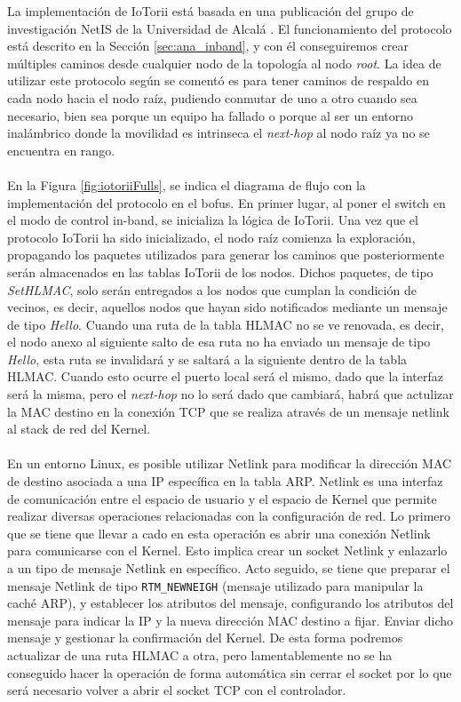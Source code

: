 La implementación de IoTorii está basada en una publicación del grupo de investigación NetIS de la Universidad de Alcalá \cite{rojas2021outperforming}. El funcionamiento del protocolo está descrito en la Sección \ref{sec:ana_inband}, y con él conseguiremos crear múltiples caminos desde cualquier nodo de la topología al nodo \textit{root}. La idea de utilizar este protocolo según se comentó es para tener caminos de respaldo en cada nodo hacia el nodo raíz, pudiendo conmutar de uno a otro cuando sea necesario, bien sea porque un equipo ha fallado o porque al ser un entorno inalámbrico donde la movilidad es intrinseca el \textit{next-hop} al nodo raíz ya no se encuentra en rango.\\
\\
En la Figura \ref{fig:iotoriiFulls}, se indica el diagrama de flujo con la implementación del protocolo en el \gls{bofus}. En primer lugar, al poner el switch en el modo de control in-band, se inicializa la lógica de IoTorii. Una vez que el protocolo IoTorii ha sido inicializado, el nodo raíz comienza la exploración, propagando los paquetes utilizados para generar los caminos que posteriormente serán almacenados en las tablas IoTorii de los nodos. Dichos paquetes, de tipo \textit{SetHLMAC}, solo serán entregados a los nodos que cumplan la condición de vecinos, es decir, aquellos nodos que hayan sido notificados mediante un mensaje de tipo \textit{Hello}. Cuando una ruta de la tabla HLMAC no se ve renovada, es decir, el nodo anexo al siguiente salto de esa ruta no ha enviado un mensaje de tipo \textit{Hello}, esta ruta se invalidará y se saltará a la siguiente dentro de la tabla HLMAC. Cuando esto ocurre el puerto local será el mismo, dado que la interfaz será la misma, pero el \textit{next-hop} no lo será dado que cambiará, habrá que actulizar la MAC destino en la conexión TCP que se realiza através de un mensaje netlink al stack de red del Kernel. \\
\\
En un entorno Linux, es posible utilizar Netlink para modificar la dirección MAC de destino asociada a una IP específica en la tabla ARP. Netlink es una interfaz de comunicación entre el espacio de usuario y el espacio de Kernel que permite realizar diversas operaciones relacionadas con la configuración de red. Lo primero que se tiene que llevar a cado en esta operación es abrir una conexión Netlink para comunicarse con el Kernel. Esto implica crear un socket Netlink y enlazarlo a un tipo de mensaje Netlink en específico. Acto seguido, se tiene que preparar el mensaje Netlink de tipo \texttt{RTM\_NEWNEIGH} (mensaje utilizado para manipular la caché ARP), y establecer los atributos del mensaje, configurando los atributos del mensaje para indicar la IP y la nueva dirección MAC destino a fijar. Enviar dicho mensaje y gestionar la confirmación del Kernel. De esta forma podremos actualizar de una ruta HLMAC a otra, pero lamentablemente no se ha conseguido hacer la operación de forma automática sin cerrar el socket por lo que será necesario volver a abrir el socket TCP con el controlador.\\
\\



